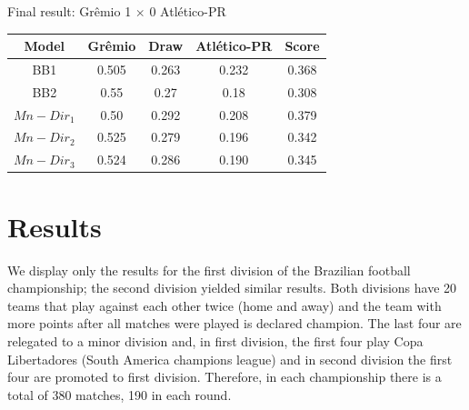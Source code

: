 \documentclass[journal,article,accept,moreauthors,pdftex,12pt,a4paper]{mdpi}
\begin{document}
Final result: Gr\^emio 1 $\times$ 0 Atl\'etico-PR

\begin{table}[h]
\begin{center}
\begin{tabular}{ccccc}

\hline
Model & Gr\^emio & Draw & Atl\'etico-PR & Score \\
\hline
\hline
BB1 & 0.505 & 0.263 & 0.232 & 0.368 \\
BB2 & 0.55 & 0.27 & 0.18 & 0.308 \\
$Mn-Dir_1$ & 0.50 & 0.292 & 0.208 & 0.379 \\
$Mn-Dir_2$ & 0.525 & 0.279 & 0.196 & 0.342\\
$Mn-Dir_3$ & 0.524 & 0.286 & 0.190 & 0.345\\
\hline
\end{tabular}
\end{center}
\end{table}


\section{Results}
\label{sec::results}

We display only the results for the first division of the Brazilian football championship; the second
division yielded similar results.
Both divisions have 20 teams that play against each other twice (home and away) and the team with more points after all matches were played is declared champion.
The last four are relegated to a minor division and, in first division, the first four play Copa Libertadores (South America champions league) and in second division the first four are promoted to first division.
Therefore, in each championship there is a total of 380 matches, 190 in each round.

\end{document}
